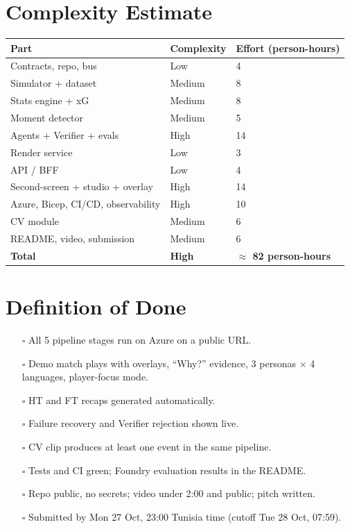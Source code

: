 \documentclass[11pt,a4paper]{article}
\begin{document}
\section{Complexity Estimate}
\begin{tabularx}{\linewidth}{@{}l l Y@{}}
\toprule
Part & Complexity & Effort (person-hours) \\
\midrule
Contracts, repo, bus                 & Low    & 4 \\
Simulator + dataset                  & Medium & 8 \\
Stats engine + xG                    & Medium & 8 \\
Moment detector                      & Medium & 5 \\
Agents + Verifier + evals            & High   & 14 \\
Render service                       & Low    & 3 \\
API / BFF                            & Low    & 4 \\
Second-screen + studio + overlay     & High   & 14 \\
Azure, Bicep, CI/CD, observability   & High   & 10 \\
CV module                            & Medium & 6 \\
README, video, submission            & Medium & 6 \\
\midrule
\textbf{Total}                       & \textbf{High} & \textbf{$\approx$ 82 person-hours} \\
\bottomrule
\end{tabularx}

\section{Definition of Done}
\begin{itemize}
  \item[$\square$] All 5 pipeline stages run on Azure on a public URL.
  \item[$\square$] Demo match plays with overlays, ``Why?'' evidence, 3 personas $\times$ 4 languages, player-focus mode.
  \item[$\square$] HT and FT recaps generated automatically.
  \item[$\square$] Failure recovery and Verifier rejection shown live.
  \item[$\square$] CV clip produces at least one event in the same pipeline.
  \item[$\square$] Tests and CI green; Foundry evaluation results in the README.
  \item[$\square$] Repo public, no secrets; video under 2:00 and public; pitch written.
  \item[$\square$] Submitted by Mon 27 Oct, 23:00 Tunisia time (cutoff Tue 28 Oct, 07:59).
\end{itemize}
\end{document}
